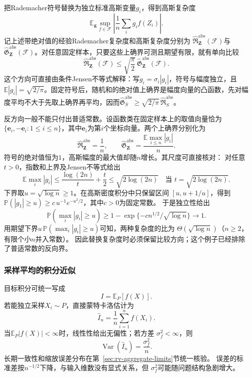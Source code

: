 把Rademacher符号替换为独立标准高斯变量\(g_i\)，得到高斯复杂度
\[ \mathbb{E}_{\bm{g}}
  \sup_{f\in\mathcal{F}}
  \left|\frac{1}{n}\sum_i g_i f(Z_i)\right|. \]
记上述带绝对值的经验Rademacher复杂度和高斯复杂度分别为
\(\widehat{\mathfrak{R}}_{\bm{Z}}^{\mathrm{abs}}(\mathcal{F})\)与
\(\widehat{\mathfrak{G}}_{\bm{Z}}^{\mathrm{abs}}(\mathcal{F})\)。对任意固定样本，只要这些上确界可测且期望有限，就有单向比较
\[
  \widehat{\mathfrak{R}}_{\bm{Z}}^{\mathrm{abs}}(\mathcal{F})
  \leq
  \sqrt{\frac{\pi}{2}}\,
  \widehat{\mathfrak{G}}_{\bm{Z}}^{\mathrm{abs}}(\mathcal{F}).
\]
这个方向可直接由条件Jensen不等式解释：写\(g_i=\sigma_i|g_i|\)，符号与幅度独立，且\(\mathbb E|g_i|=\sqrt{2/\pi}\)。固定符号后，随机和的绝对值上确界是幅度向量的凸函数，先对幅度平均不大于先取上确界再平均，因而\(\widehat{\mathfrak G}^{\mathrm{abs}}_S\geq\sqrt{2/\pi}\,\widehat{\mathfrak R}^{\mathrm{abs}}_S\)。

反方向一般不能只付出普适常数。设函数类在固定样本上的取值向量恰为
\(\{\bm e_i,-\bm e_i:1\leq i\leq n\}\)，其中\(\bm e_i\)为第\(i\)个坐标向量。两个上确界分别化为
\[
 \widehat{\mathfrak R}^{\mathrm{abs}}_{\bm Z}=\frac1n,\qquad
 \widehat{\mathfrak G}^{\mathrm{abs}}_{\bm Z}
   =\frac{\mathbb E\max_{i\leq n}|g_i|}{n}.
\]
符号的绝对值恒为\(1\)，高斯幅度的最大值却随\(n\)增长。其尺度可直接核对：
对任意\(t>0\)，指数和上界及Jensen不等式给出
\[
 \mathbb E\max_i|g_i|
 \leq\frac{\log(2n)}t+\frac t2
 \leq\sqrt{2\log(2n)}
 \quad\text{当 }t=\sqrt{2\log(2n)}.
\]
下界取\(u=\sqrt{\log n}\geq1\)。在高斯密度积分中只保留区间
\([u,u+1/u]\)，得到
\(\mathbb P(|g_1|\geq u)\geq c\,u^{-1}e^{-u^2/2}\)，其中\(c>0\)为固定常数。
于是独立性给出
\[
 \mathbb P(\max_i|g_i|\geq u)
 \geq1-\exp\{-cn^{1/2}/\sqrt{\log n}\}\longrightarrow1.
\]
用期望下界\(u\,\mathbb P(\max_i|g_i|\geq u)\)可知，两种复杂度的比为
\(\Theta(\sqrt{\log n})\)（\(n\geq2\)，有限个小\(n\)并入常数）。
因此替换复杂度时必须保留比较方向；这个例子已经排除了普适常数的反向界。

\subsubsection{采样平均的积分近似}
\label{sec:probability-monte-carlo-variance-reduction}
目标积分可统一写成
\[ I=\mathbb{E}_P[f(X)]. \]
若能独立采样\(X_i\sim P\)，直接蒙特卡洛估计为
\[ \widehat{I}_n
  =\frac{1}{n}\sum_{i=1}^{n}f(X_i). \]
当\(\mathbb E_P|f(X)|<\infty\)时，线性性给出无偏性；若方差
\(\sigma_f^2<\infty\)，则
\[ \operatorname{Var}(\widehat I_n)=\frac{\sigma_f^2}{n}. \]
长期一致性和缩放误差分布在第~\ref{sec:rv-aggregate-limits}节统一核验。
误差的标准差按\(n^{-1/2}\)下降，与输入维数没有显式关系，但
\(\sigma_f^2\)可能随问题结构急剧增大。


